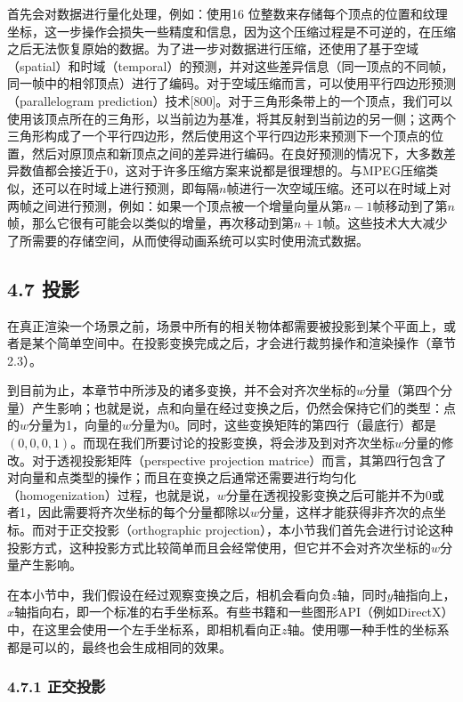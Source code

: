 \documentclass[
  paper=a4,
  ,captions=tableheading
]{scrartcl}
\begin{document}
首先会对数据进行量化处理，例如：使用16
位整数来存储每个顶点的位置和纹理坐标，这一步操作会损失一些精度和信息，因为这个压缩过程是不可逆的，在压缩之后无法恢复原始的数据。为了进一步对数据进行压缩，还使用了基于空域（spatial）和时域（temporal）的预测，并对这些差异信息（同一顶点的不同帧，同一帧中的相邻顶点）进行了编码。对于空域压缩而言，可以使用平行四边形预测（parallelogram
prediction）技术{[}800{]}。对于三角形条带上的一个顶点，我们可以使用该顶点所在的三角形，以当前边为基准，将其反射到当前边的另一侧；这两个三角形构成了一个平行四边形，然后使用这个平行四边形来预测下一个顶点的位置，然后对原顶点和新顶点之间的差异进行编码。在良好预测的情况下，大多数差异数值都会接近于0，这对于许多压缩方案来说都是很理想的。与MPEG压缩类似，还可以在时域上进行预测，即每隔\(n\)帧进行一次空域压缩。还可以在时域上对两帧之间进行预测，例如：如果一个顶点被一个增量向量从第\(n-1\)帧移动到了第\(n\)帧，那么它很有可能会以类似的增量，再次移动到第\(n+1\)帧。这些技术大大减少了所需要的存储空间，从而使得动画系统可以实时使用流式数据。

\subsection{4.7 投影}\label{ux6295ux5f71}

在真正渲染一个场景之前，场景中所有的相关物体都需要被投影到某个平面上，或者是某个简单空间中。在投影变换完成之后，才会进行裁剪操作和渲染操作（章节2.3）。

到目前为止，本章节中所涉及的诸多变换，并不会对齐次坐标的\(w\)分量（第四个分量）产生影响；也就是说，点和向量在经过变换之后，仍然会保持它们的类型：点的\(w\)分量为1，向量的\(w\)分量为0。同时，这些变换矩阵的第四行（最底行）都是\((0,0,0,1)\)。而现在我们所要讨论的投影变换，将会涉及到对齐次坐标\(w\)分量的修改。对于透视投影矩阵（perspective
projection
matrice）而言，其第四行包含了对向量和点类型的操作；而且在变换之后通常还需要进行均匀化（homogenization）过程，也就是说，\(w\)分量在透视投影变换之后可能并不为0或者1，因此需要将齐次坐标的每个分量都除以\(w\)分量，这样才能获得非齐次的点坐标。而对于正交投影（orthographic
projection），本小节我们首先会进行讨论这种投影方式，这种投影方式比较简单而且会经常使用，但它并不会对齐次坐标的\(w\)分量产生影响。

在本小节中，我们假设在经过观察变换之后，相机会看向负\(z\)轴，同时\(y\)轴指向上，\(x\)轴指向右，即一个标准的右手坐标系。有些书籍和一些图形API（例如DirectX）中，在这里会使用一个左手坐标系，即相机看向正\(z\)轴。使用哪一种手性的坐标系都是可以的，最终也会生成相同的效果。

\subsubsection{4.7.1 正交投影}\label{ux6b63ux4ea4ux6295ux5f71}
\end{document}
